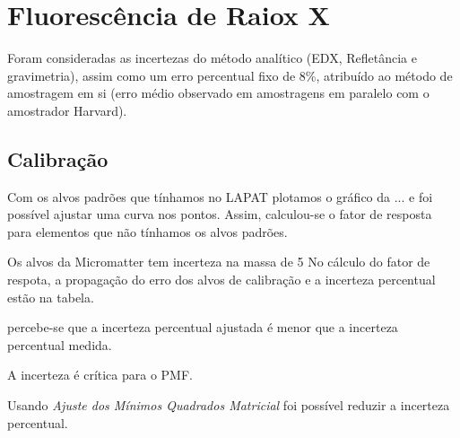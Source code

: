 \section{Fluorescência de Raiox X}


Foram consideradas as 
incertezas do método analítico (EDX, Refletância e gravimetria), 
assim como um erro percentual fixo de 8\%, atribuído ao método de amostragem em si 
(erro médio observado em amostragens em paralelo com o amostrador Harvard).

\subsection{Calibração}

Com os alvos padrões que tínhamos no LAPAT plotamos o gráfico
da ... e foi possível ajustar uma curva nos pontos. 
Assim, calculou-se o fator de resposta para elementos que 
não tínhamos os alvos padrões. 

Os alvos da Micromatter tem incerteza na massa de 5%
No cálculo do fator de respota, a propagação do erro dos alvos de calibração
e a incerteza percentual estão na tabela. 

percebe-se que a incerteza percentual ajustada é menor que 
a incerteza percentual medida. 

A incerteza é crítica para o PMF. 

Usando \textit{Ajuste dos Mínimos Quadrados Matricial} foi possível
reduzir a incerteza percentual.  

\begin{table}[H]
 
  \begin{scriptsize} %
  \caption{}
  
  \end{scriptsize}
\end{table}

\begin{table}[H]
  
  \begin{scriptsize} %
  \caption{}
  
  \end{scriptsize}
\end{table}


\begin{table}[H]
  
  \begin{footnotesize} %
  \caption{}
  
  \end{footnotesize}
\end{table}

